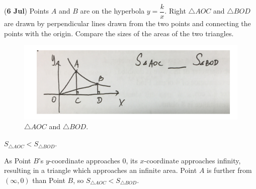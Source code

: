 \documentclass[12pt,answers]{exam}
\renewcommand{\frac}[2]{\dfrac{#1}{#2}}
\newcommand{\qndate}[2]{(\textbf{#1 #2})}
\begin{document}
\begin{questions}
	\question \qndate{6}{Jul} Points $A$ and $B$ are on the hyperbola $y = \frac{k}{x}$. Right $\triangle AOC$
	and $\triangle BOD$ are drawn by perpendicular lines drawn from the two points and connecting
	the points with the origin. Compare the sizes of the areas of the two triangles.
	\begin{figure}[htpb]
		\centering
		\includegraphics[scale=.8]{./images/0706_Tri.png}
		\caption{$\triangle AOC$ and $\triangle BOD$.}
		\label{fig:0706_Tri}
	\end{figure}
	\begin{solution}
		$S_{\triangle AOC} < S_{\triangle BOD}$.

		As Point $B$'s $y$-coordinate approaches 0, its $x$-coordinate approaches infinity,
		resulting in a triangle which approaches an infinite area. Point $A$ is further from
		$(\infty, 0)$ than Point $B$, so $S_{\triangle AOC} < S_{\triangle BOD}$.
	\end{solution}


\end{questions}
\end{document}
